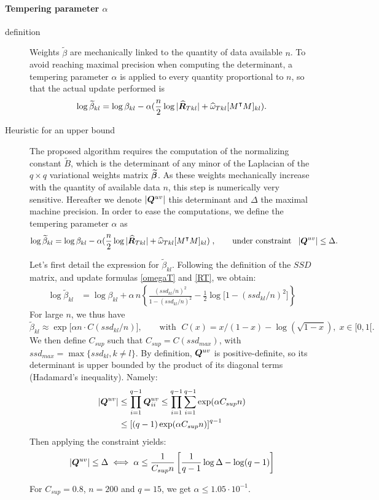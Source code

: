 \paragraph{Tempering parameter $\alpha$} \label{alpha}
\begin{description}
\item[definition]Weights $\widetilde{\beta}$ are mechanically linked to the quantity of data available $n$. To avoid reaching maximal precision when computing the determinant, a tempering parameter $\alpha$ is applied to every quantity proportional to $n$, so that the actual update performed is $$\log \widetilde{\beta}_{kl} = \log \beta_{kl} - \alpha(\frac{n}{2}\log|\widehat{{\boldsymbol{R}}}_{Tkl}| + \widehat{\omega}_{Tkl} [M^\intercal M]_{kl}).$$
\item[Heuristic for an upper bound] The proposed algorithm requires the computation of the normalizing constant $\widetilde{B}$, which is the determinant of any minor of the Laplacian  of the $q\times q$ variational weights matrix ${\widetilde{{\boldsymbol{\beta}}}}$. As these weights  mechanically increase with the quantity of available data $n$, this step is numerically very sensitive.  Hereafter we denote $|{\boldsymbol{Q}}^{uv}|$ this determinant and $\Delta$ the maximal machine precision. In order to ease the computations, we define the tempering parameter $\alpha$ as $$\log \widetilde{\beta}_{kl} = \log \beta_{kl} - \alpha(\frac{n}{2}\log|\widehat{{\boldsymbol{R}}}_{Tkl}| + \widehat{\omega}_{Tkl} [M^\intercal M]_{kl})\;,\qquad \text{under constraint}\;\;\; |{\boldsymbol{Q}}^{uv}| \leq \Delta.$$

Let's first detail the expression for $\widetilde{\beta}_{kl}$. Following the definition of the $SSD$ matrix, and update formulas \eqref{omegaT} and \eqref{RT}, we obtain:
\begin{align*}
    \log \widetilde{\beta}_{kl} &=\log \beta_{kl} +\alpha \,n\left\{\frac{(ssd_{kl}/n)^2}{1-(ssd_{kl}/n)^2} -\frac12\log\big[1-(ssd_{kl}/n)^2\big]\right\}
\end{align*}
For large $n$, we thus have $$\widetilde{\beta}_{kl}\approx \exp \big[\alpha n \cdot C(ssd_{kl}/n)\big], \qquad \text{with }\; C(x)=x/(1-x) -\log(\sqrt{1-x}),\; x\in [0,1[.$$ 
We then define $C_{sup}$ such that $C_{sup} = C(ssd_{max})$, with $ ssd_{max}=\max\{ssd_{kl}, k\neq l\}$.
By definition, ${\boldsymbol{Q}}^{uv}$ is positive-definite, so its determinant is upper bounded by the product of its diagonal terms (Hadamard's inequality). Namely:
\begin{align*}
    |{\boldsymbol{Q}}^{uv}|&\leq \prod_{i=1}^{q-1} {\boldsymbol{Q}}^{uv}_{ii} \leq \prod_{i=1}^{q-1}\sum_{i=1}^{q-1} \exp (\alpha C_{sup} n)\\
    &\leq \left[(q-1)\exp(\alpha C_{sup} n)\right]^{q-1}
\end{align*}
Then applying the constraint yields:
\begin{align*}
    |{\boldsymbol{Q}}^{uv}| \leq \Delta \iff  \alpha \leq \frac{1}{C_{sup} n} \left[ \frac{1}{q-1}\log \Delta - \log(q-1)\right] 
\end{align*}

For $C_{sup}=0.8$, $n=200$ and $q=15$, we get $\alpha \leq 1.05\cdot 10^{-1}$.
\end{description}


